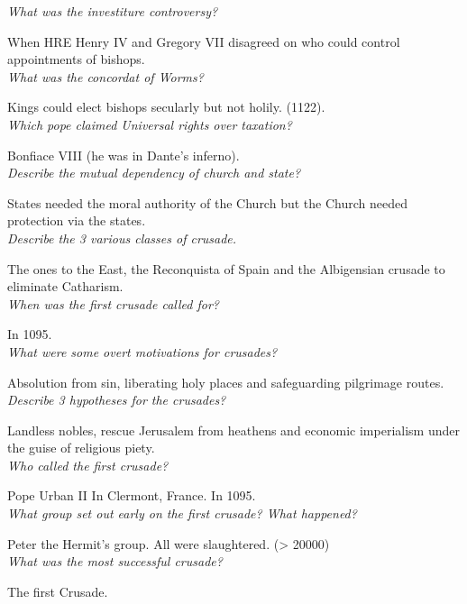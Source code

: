\documentclass[12pt]{article}
\begin{document}
\textit{What was the investiture controversy?}

When HRE Henry IV and Gregory VII disagreed on who could control appointments of bishops.\\


\textit{What was the concordat of Worms?}

Kings could elect bishops secularly but not holily. (1122).\\

\textit{Which pope claimed Universal rights over taxation?}

Bonfiace VIII (he was in Dante's inferno).\\

\textit{Describe the mutual dependency of church and state?}

States needed the moral authority of the Church but the Church needed protection via the states.\\

\textit{Describe the 3 various classes of crusade.}

The ones to the East, the Reconquista of Spain and the Albigensian crusade to eliminate Catharism.\\

\textit{When was the first crusade called for?}

In 1095.\\

\textit{What were some overt motivations for crusades?}

Absolution from sin, liberating holy places and safeguarding pilgrimage routes.\\

\textit{Describe 3 hypotheses for the crusades?}

Landless nobles, rescue Jerusalem from heathens and economic imperialism under the guise of religious piety.\\

\textit{Who called the first crusade?}

Pope Urban II In Clermont, France. In 1095.\\

\textit{What group set out early on the first crusade? What happened?}

Peter the Hermit's group. All were slaughtered. (> 20000) \\

\textit{What was the most successful crusade?}

The first Crusade.\\
\end{document}
